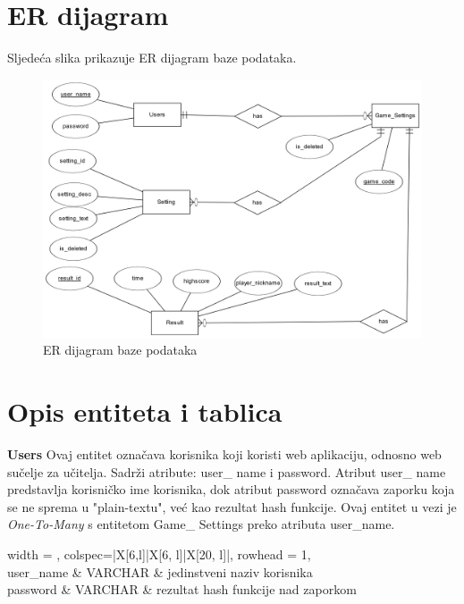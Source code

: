 \documentclass[times, utf8, zavrsni]{fer}
\begin{document}
	\section{ER dijagram}
		Sljedeća slika prikazuje ER dijagram baze podataka.
		\begin{figure}[H]
			\includegraphics[width=\linewidth]{"slike/ER.png"} 
			\centering
			\caption{ER dijagram baze podataka}
			\label{fig:erdijagram}
		\end{figure}

	
	\section{Opis entiteta i tablica}
			\textbf {Users} \hspace{5mm}
			{Ovaj entitet označava korisnika koji koristi web aplikaciju, odnosno web sučelje za učitelja. Sadrži atribute: user\_ name i password.
			Atribut user\_ name predstavlja korisničko ime korisnika, dok atribut password označava zaporku koja se ne sprema u "plain-textu", već kao 
			rezultat hash funkcije.
			Ovaj entitet u vezi je \textit{One-To-Many} s entitetom Game\_ Settings preko atributa user\_name.}
				
				\begin{longtblr}[
					label=none,
					entry=none
					]{
						width = \textwidth,
						colspec={|X[6,l]|X[6, l]|X[20, l]|}, 
						rowhead = 1,
					} %
					\hline {}	 \\ \hline[3pt]
					user\_name & VARCHAR	&  	jedinstveni naziv korisnika  	\\ \hline
					password	& VARCHAR &  rezultat hash funkcije nad zaporkom 	\\ \hline 
				\end{longtblr}
\end{document}
